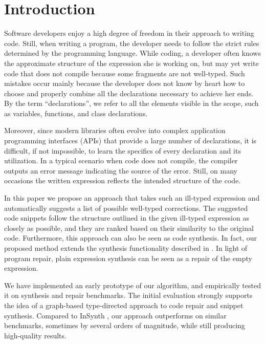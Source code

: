 \section{Introduction}
\label{sec:intro}
Software developers enjoy a high degree of freedom in their approach to writing code. Still, when writing a program, the developer needs to follow the strict rules determined by the programming language. While coding, a developer often knows the approximate structure of the expression she is working on, but may yet write code that does not compile because some fragments are not well-typed. Such mistakes occur mainly because the developer does not know by heart how to choose and properly combine all the declarations necessary to achieve her ends. By the term ``declarations'', we refer to all the elements visible in the scope, such as variables, functions, and class declarations.

Moreover, since modern libraries often evolve into complex application programming interfaces (APIs) that provide a large number of declarations, it is difficult, if not impossible, to learn the specifics of every declaration and its utilization. In a typical scenario when code does not compile, the compiler outputs an error message indicating the source of the error. Still, on many occasions the written expression reflects the intended structure of the code.

In this paper we propose an approach that takes such an ill-typed expression and automatically suggests a list of possible well-typed corrections. The suggested code snippets follow the structure outlined in the given ill-typed expression as closely as possible, and they are ranked based on their similarity to the original code. Furthermore, this approach can also be seen as code synthesis. In fact, our proposed method extends the synthesis functionality described in \cite{MandelinetALL2005Jungloid, GveroETAL13CompleteCompletionTypesWeights, PerelmanGBG12}. In light of program repair, plain expression synthesis can be seen as a repair of the empty expression.


We have implemented an early prototype of our algorithm, and empirically tested it on synthesis and repair benchmarks. The initial evaluation strongly supports the idea of a graph-based type-directed approach to code repair and snippet synthesis. Compared to InSynth \cite{GveroETAL13CompleteCompletionTypesWeights}, our approach outperforms on similar benchmarks, sometimes by several orders of magnitude, while still producing high-quality results.
